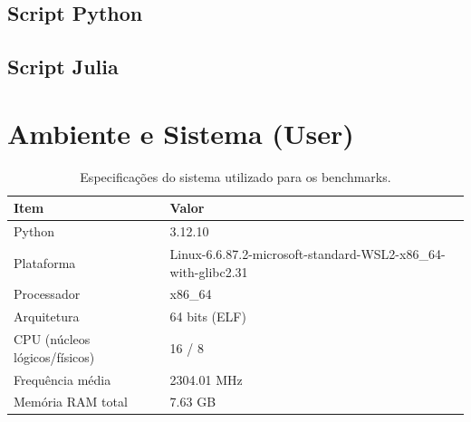 \documentclass[11pt,a4paper]{article}
\begin{document}
\subsection*{Script Python}


\subsection*{Script Julia}


\section*{Ambiente e Sistema (User)}
\begin{table}[h!]\centering
\caption{Especificações do sistema utilizado para os benchmarks.}
\label{tab:sistema}
\begin{tabular}{l l}
\toprule
\textbf{Item} & \textbf{Valor} \\
\midrule
Python & 3.12.10 \\
Plataforma & Linux-6.6.87.2-microsoft-standard-WSL2-x86\_64-with-glibc2.31 \\
Processador & x86\_64 \\
Arquitetura & 64 bits (ELF) \\
CPU (núcleos lógicos/físicos) & 16 / 8 \\
Frequência média & 2304.01 MHz \\
Memória RAM total & 7.63 GB \\
\bottomrule
\end{tabular}
\end{table}
\end{document}
